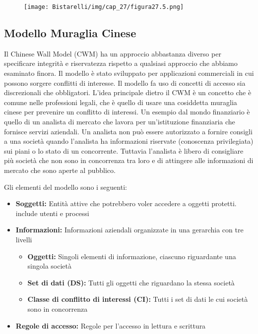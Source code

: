 \begin{figure}[H]
	\centering
    \texttt{[image: Bistarelli/img/cap\_27/figura27.5.png]}
\end{figure}

\newpage
\subsection{Modello Muraglia Cinese}
Il Chinese Wall Model (CWM) ha un approccio abbastanza diverso per specificare integrità e riservatezza rispetto a qualsiasi approccio che abbiamo esaminato finora. Il modello è stato sviluppato per applicazioni commerciali in cui possono sorgere conflitti di interesse. Il modello fa uso di concetti di accesso sia discrezionali che obbligatori. L'idea principale dietro il CWM è un concetto che è comune nelle professioni legali, che è quello di usare una cosiddetta muraglia cinese per prevenire un conflitto di interessi. Un esempio dal mondo finanziario è quello di un analista di mercato che lavora per un'istituzione finanziaria che fornisce servizi aziendali. Un analista non può essere autorizzato a fornire consigli a una società quando l'analista ha informazioni riservate (conoscenza privilegiata) sui piani o lo stato di un concorrente. Tuttavia l'analista è libero di consigliare più società che non sono in concorrenza tra loro e di attingere alle informazioni di mercato che sono aperte al pubblico. 

\singlespacing

Gli elementi del modello sono i seguenti:

\begin{itemize}
    \item \textbf{Soggetti:} Entità attive che potrebbero voler accedere a oggetti protetti. include utenti e processi

    \item \textbf{Informazioni:} Informazioni aziendali organizzate in una gerarchia con tre livelli
    
    \begin{itemize}
        \item \textbf{Oggetti:} Singoli elementi di informazione, ciascuno riguardante una singola società
        
        \item \textbf{Set di dati (DS):} Tutti gli oggetti che riguardano la stessa società
        
        \item \textbf{Classe di conflitto di interessi (CI):} Tutti i set di dati le cui società sono in concorrenza

    \end{itemize}
    \item \textbf{Regole di accesso:} Regole per l'accesso in lettura e scrittura
\end{itemize}

